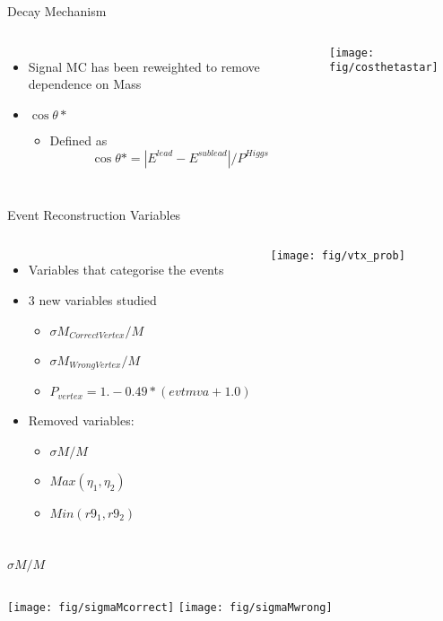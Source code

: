 \documentclass[t, 8pt]{beamer}
\begin{document}
\begin{frame}{Decay Mechanism}
  \begin{columns}[c]
  \begin{itemize}  
    \item Signal MC has been reweighted to remove dependence on Mass
    \item $\cos \theta \ast $
    \begin{itemize}  
      \item Defined as 
      \begin{equation}
      \cos \theta \ast = | E^{lead}-E^{sublead} | / P^{Higgs}
      \end{equation}
    \end{itemize}  
  \end{itemize}
    \texttt{[image: fig/costhetastar]}
  \end{columns}
\end{frame}

\begin{frame}{Event Reconstruction Variables}
 \begin{columns}[c]
 \begin{itemize}  
   \item Variables that categorise the events
   \item 3 new variables studied
   \begin{itemize}  
     \item $\sigma M_{Correct Vertex} / M$
     \item $\sigma M_{Wrong Vertex} / M$
     \item $P_{vertex} =  1.-0.49*(evtmva+1.0)$
   \end{itemize}
   \item Removed variables:
   \begin{itemize}  
     \item $\sigma M / M$ 
     \item $Max(\eta_1,\eta_2)$
     \item $Min(r9_1,r9_2)$
   \end{itemize}
 \end{itemize}
    \texttt{[image: fig/vtx\_prob]}
  \end{columns}
\end{frame}

\begin{frame}{$\sigma M / M$}
  \begin{columns}[c]
    \texttt{[image: fig/sigmaMcorrect]}
    \texttt{[image: fig/sigmaMwrong]}
  \end{columns}
\end{frame}
\end{document}
